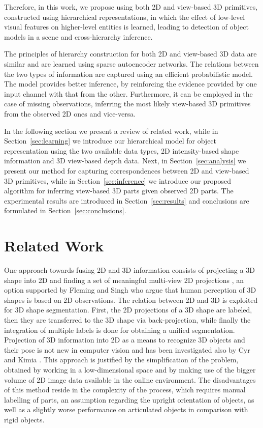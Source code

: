 \documentclass[runningheads]{llncs}
\begin{document}
Therefore, in this work, we propose using both 2D and view-based 3D primitives, constructed using hierarchical representations, in which the effect of low-level visual features on higher-level entities is learned, leading to detection of object models in a scene and cross-hierarchy inference. 

The principles of hierarchy construction for both 2D and view-based 3D data are similar and are learned using sparse autoencoder networks. The relations between the two types of information are captured using an efficient probabilistic model. The model provides better inference, by reinforcing the evidence provided by one input channel with that from the other. Furthermore, it can be employed in the case of missing observations, inferring the most likely view-based 3D primitives from the observed 2D ones and vice-versa. 

In the following section we present a review of related work, while in Section~\ref{sec:learning} we introduce our hierarchical model for object representation using the two available data types, 2D intensity-based shape information and 3D view-based depth data. Next, in Section~\ref{sec:analysis} we present our method for capturing correspondences between 2D and view-based 3D primitives, while in Section~\ref{sec:inference} we introduce our proposed algorithm for inferring view-based 3D parts given observed 2D parts. The experimental results are introduced in Section~\ref{sec:results} and conclusions are formulated in Section~\ref{sec:conclusions}.

\section{Related Work}
\label{sec:related_work}  

One approach towards fusing 2D and 3D information consists of projecting a 3D shape into 2D and finding a set of meaningful multi-view 2D projections \cite{WangGWC0C13}, an option supported by Fleming and Singh \cite{Fleming2009} who argue that human perception of 3D shapes is based on 2D observations. The relation between 2D and 3D is exploited for 3D shape segmentation. First, the 2D projections of a 3D shape are labeled, then they are transferred to the 3D shape via back-projection, while finally the integration of multiple labels is done for obtaining a unified segmentation. Projection of 3D information into 2D as a means to recognize 3D objects and their pose is not new in computer vision and has been investigated also by Cyr and Kimia \cite{Cyr2001}. This approach is justified by the simplification of the problem, obtained by working in a low-dimensional space and by making use of the bigger volume of 2D image data available in the online environment. The disadvantages of this method reside in the complexity of the process, which requires manual labelling of parts, an assumption regarding the upright orientation of objects, as well as a slightly worse performance on articulated objects in comparison with rigid objects.
\end{document}
